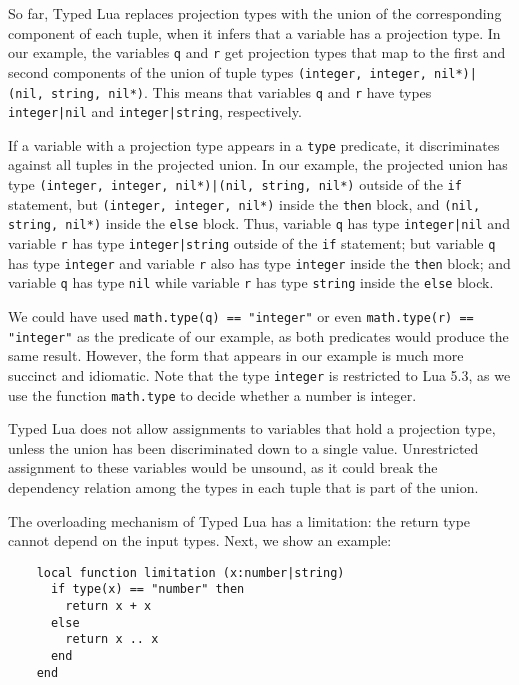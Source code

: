 So far, Typed Lua replaces projection types with the union of the
corresponding component of each tuple, when it infers that a variable
has a projection type.
In our example, the variables \texttt{q} and \texttt{r} get projection
types that map to the first and second components of the union of
tuple types \texttt{(integer, integer, nil*)|(nil, string, nil*)}.
This means that variables \texttt{q} and \texttt{r} have types
\texttt{integer|nil} and \texttt{integer|string}, respectively.

If a variable with a projection type appears in a \texttt{type} predicate,
it discriminates against all tuples in the projected union.
In our example, the projected union has type
\texttt{(integer, integer, nil*)|(nil, string, nil*)} outside of the
\texttt{if} statement,
but \texttt{(integer, integer, nil*)} inside the \texttt{then} block,
and \texttt{(nil, string, nil*)} inside the \texttt{else} block.
Thus, variable \texttt{q} has type \texttt{integer|nil} and variable
\texttt{r} has type \texttt{integer|string} outside of the
\texttt{if} statement;
but variable \texttt{q} has type \texttt{integer} and variable \texttt{r} also
has type \texttt{integer} inside the \texttt{then} block;
and variable \texttt{q} has type \texttt{nil} while variable \texttt{r}
has type \texttt{string} inside the \texttt{else} block.

We could have used \texttt{math.type(q) == "integer"} or
even \texttt{math.type(r) == "integer"} as the predicate of our example,
as both predicates would produce the same result.
However, the form that appears in our example is much more succinct and idiomatic.
Note that the type \texttt{integer} is restricted to Lua 5.3,
as we use the function \texttt{math.type} to decide whether a number is integer.

Typed Lua does not allow assignments to variables that hold a projection type,
unless the union has been discriminated down to a single value.
Unrestricted assignment to these variables would be unsound,
as it could break the dependency relation among the types in each tuple
that is part of the union.

The overloading mechanism of Typed Lua has a limitation:
the return type cannot depend on the input types.
Next, we show an example:
\begin{verbatim}
    local function limitation (x:number|string)
      if type(x) == "number" then
        return x + x
      else
        return x .. x
      end
    end
\end{verbatim}

